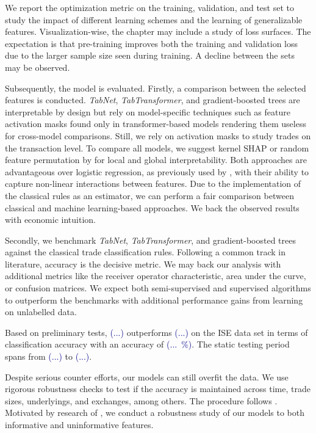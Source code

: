 We report the optimization metric on the training, validation, and test set to study the impact of different learning schemes and the learning of generalizable features. Visualization-wise, the chapter may include a study of loss surfaces. The expectation is that pre-training improves both the training and validation loss due to the larger sample size seen during training. A decline between the sets may be observed.

Subsequently, the model is evaluated. Firstly, a comparison between the selected features is conducted. \textit{TabNet}, \textit{TabTransformer}, and gradient-boosted trees are interpretable by design but rely on model-specific techniques such as feature activation masks found only in transformer-based models rendering them useless for cross-model comparisons. Still, we rely on activation masks to study trades on the transaction level. To compare all models, we suggest kernel \gls{SHAP} \autocite{lundbergUnifiedApproachInterpreting2017} or random feature permutation by \textcite{breimanRandomForests2001} for local and global interpretability. Both approaches are advantageous over logistic regression, as previously used by \textcites{savickasInferringDirectionOption2003}{chakrabartyTradeClassificationAlgorithms2012}, with their ability to capture non-linear interactions between features. Due to the implementation of the classical rules as an estimator, we can perform a fair comparison between classical and machine learning-based approaches. We back the observed results with economic intuition.

Secondly, we benchmark \textit{TabNet}, \textit{TabTransformer}, and gradient-boosted trees against the classical trade classification rules. Following a common track in literature, accuracy is the decisive metric. We may back our analysis with additional metrics like the receiver operator characteristic, area under the curve, or confusion matrices. We expect both semi-supervised and supervised algorithms to outperform the benchmarks with additional performance gains from learning on unlabelled data.

Based on preliminary tests, \textcolor{darkblue}{(...)} outperforms \textcolor{darkblue}{(...)} on the \gls{ISE} data set in terms of classification accuracy with an accuracy of \textcolor{darkblue}{(...~\%)}. The static testing period spans from \textcolor{darkblue}{(...)} to \textcolor{darkblue}{(...)}.


Despite serious counter efforts, our models can still overfit the data. We use rigorous robustness checks to test if the accuracy is maintained across time, trade sizes, underlyings, and exchanges, among others. The procedure follows \textcites{chakrabartyTradeClassificationAlgorithms2012}{grauerOptionTradeClassification2022}{ronenMachineLearningTrade2022}{savickasInferringDirectionOption2003}. Motivated by research of \textcite{grinsztajnWhyTreebasedModels2022}, we conduct a robustness study of our models to both informative and uninformative features.

